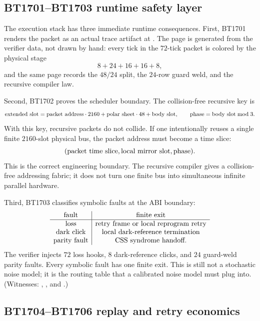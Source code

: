 \documentclass[11pt]{article}
\begin{document}
\subsection{BT1701--BT1703 runtime safety layer}

The execution stack has three immediate runtime consequences.  First, BT1701
renders the packet as an actual trace artifact at
.
The page is generated from the verifier data, not drawn by hand: every tick in
the \(72\)-tick packet is colored by the physical stage
\[
  8+24+16+16+8,
\]
and the same page records the \(48/24\) split, the \(24\)-row guard weld, and
the recursive compiler law.

Second, BT1702 proves the scheduler boundary.  The collision-free recursive key is
\[
  \hbox{extended slot}
  =\hbox{packet address}\cdot2160+\hbox{polar sheet}\cdot48+\hbox{body slot},
  \qquad
  \hbox{phase}=\hbox{body slot}\bmod 3.
\]
With this key, recursive packets do not collide.  If one intentionally reuses a
single finite \(2160\)-slot physical bus, the packet address must become a time
slice:
\[
  (\hbox{packet time slice},\hbox{local mirror slot},\hbox{phase}).
\]
This is the correct engineering boundary.  The recursive compiler gives a
collision-free addressing fabric; it does not turn one finite bus into
simultaneous infinite parallel hardware.

Third, BT1703 classifies symbolic faults at the ABI boundary:
\[
\begin{array}{c|c}
\hbox{fault} & \hbox{finite exit}\\
\hline
\hbox{loss} & \hbox{retry frame or local reprogram retry}\\
\hbox{dark click} & \hbox{local dark-reference termination}\\
\hbox{parity fault} & \hbox{CSS syndrome handoff}.
\end{array}
\]
The verifier injects \(72\) loss hooks, \(8\) dark-reference clicks, and \(24\)
guard-weld parity faults.  Every symbolic fault has one finite exit.  This is
still not a stochastic noise model; it is the routing table that a calibrated
noise model must plug into.  (Witnesses:
,
, and
.)

\subsection{BT1704--BT1706 replay and retry economics}
\end{document}
